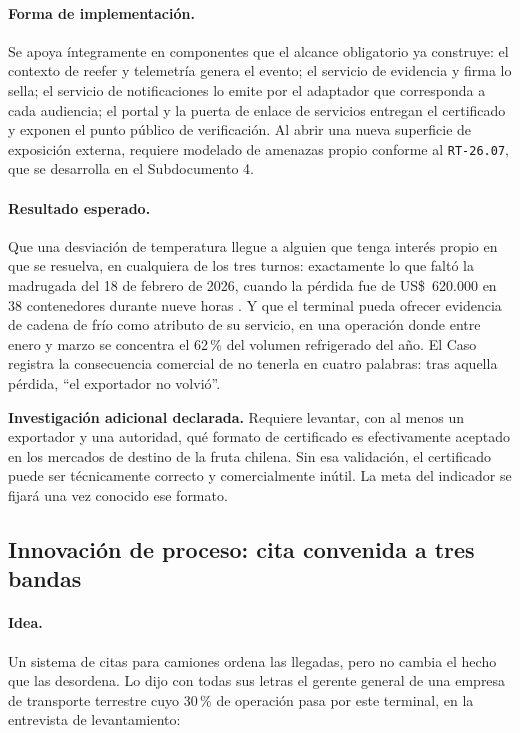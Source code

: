 \paragraph*{Forma de implementación.}
Se apoya íntegramente en componentes que el alcance obligatorio ya construye:
el contexto de reefer y telemetría genera el evento; el servicio de evidencia y
firma lo sella; el servicio de notificaciones lo emite por el adaptador que
corresponda a cada audiencia; el portal y la puerta de enlace de servicios
entregan el certificado y exponen el punto público de verificación. Al abrir
una nueva superficie de exposición externa, requiere modelado de amenazas
propio conforme al \texttt{RT-26.07}, que se desarrolla en el Subdocumento 4.

\paragraph*{Resultado esperado.}
Que una desviación de temperatura llegue a alguien que tenga interés propio en
que se resuelva, en cualquiera de los tres turnos: exactamente lo que faltó la
madrugada del 18 de febrero de 2026, cuando la pérdida fue de US\$~620.000 en
38 contenedores durante nueve horas \Hecho. Y que el terminal pueda ofrecer
evidencia de cadena de frío como atributo de su servicio, en una operación
donde entre enero y marzo se concentra el 62\,\% del volumen refrigerado del
año. El Caso registra la consecuencia comercial de no tenerla en cuatro
palabras: tras aquella pérdida, \enquote{el exportador no volvió}.

\begin{bloqueDuda}
\textbf{Investigación adicional declarada.} Requiere levantar, con al menos un
exportador y una autoridad, qué formato de certificado es efectivamente
aceptado en los mercados de destino de la fruta chilena. Sin esa validación, el
certificado puede ser técnicamente correcto y comercialmente inútil. La meta
del indicador se fijará una vez conocido ese formato.
\end{bloqueDuda}

\subsection{Innovación de proceso: cita convenida a tres bandas}

\paragraph*{Idea.}
Un sistema de citas para camiones ordena las llegadas, pero no cambia el hecho
que las desordena. Lo dijo con todas sus letras el gerente general de una
empresa de transporte terrestre cuyo 30\,\% de operación pasa por este
terminal, en la entrevista de levantamiento:

